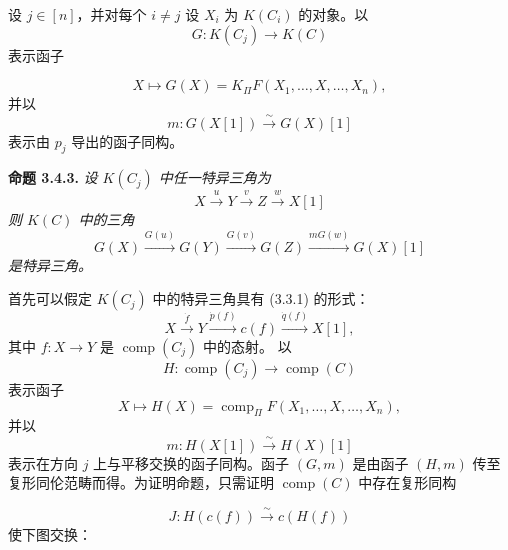 \clearpage
{}%
\begingroup
\small
\setlength{\abovedisplayskip}{3pt plus 2pt minus 2pt}%
\setlength{\belowdisplayskip}{3pt plus 2pt minus 2pt}%
\setlength{\jot}{2pt}%

设 $j\in[n]$，并对每个 $i\neq j$ 设 $X_i$ 为 $K(C_i)$ 的对象。以
\[
  G\colon K(C_j)\longrightarrow K(C)
\]
表示函子

\begingroup
\makeatletter
\tagsleft@true
\let\veqno\@@leqno
\makeatother
\begin{equation}
  X\longmapsto G(X)=K_{\Pi}F(X_1,\ldots,X,\ldots,X_n),
  \tag{3.4.2.1}
\end{equation}
\endgroup
{}
并以
\[
  m\colon G(X[1])\xrightarrow{\sim}G(X)[1]
\]
表示由 $p_j$ 导出的函子同构。

\noindent\textbf{命题 3.4.3.}\quad
\emph{设 $K(C_j)$ 中任一特异三角为}
\[
  X\xrightarrow{u}Y\xrightarrow{v}Z\xrightarrow{w}X[1]
\]
\emph{则 $K(C)$ 中的三角}
\[
  G(X)\xrightarrow{G(u)}G(Y)\xrightarrow{G(v)}G(Z)
  \xrightarrow{mG(w)}G(X)[1]
\]
\emph{是特异三角。}

首先可以假定 $K(C_j)$ 中的特异三角具有 (3.3.1) 的形式：
\[
  X\xrightarrow{\dot f}Y\xrightarrow{\dot p(f)}c(f)
  \xrightarrow{\dot q(f)}X[1],
\]
其中 $f\colon X\longrightarrow Y$ 是 $\operatorname{comp}(C_j)$ 中的态射。
以
\[
  H\colon\operatorname{comp}(C_j)\longrightarrow\operatorname{comp}(C)
\]
表示函子
\[
  X\longmapsto H(X)=\operatorname{comp}_{\Pi}F
  (X_1,\ldots,X,\ldots,X_n),
\]
并以
\[
  m\colon H(X[1])\xrightarrow{\sim}H(X)[1]
\]
表示在方向 $j$ 上与平移交换的函子同构。函子 $(G,m)$ 是由函子 $(H,m)$
传至复形同伦范畴而得。为证明命题，只需证明
$\operatorname{comp}(C)$ 中存在复形同构

\[
  J\colon H(c(f))\xrightarrow{\sim}c(H(f))
\]
使下图交换：

